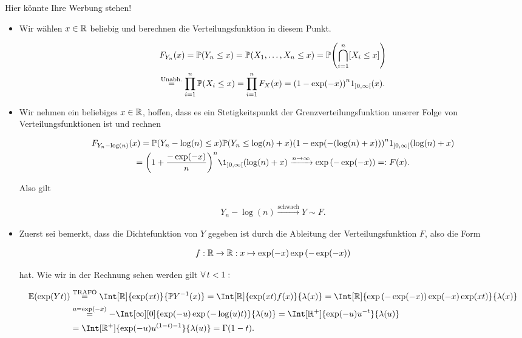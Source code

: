 \begin{solution}
  Hier könnte Ihre Werbung stehen!

  \begin{itemize}
    \item[(a)] Wir wählen $x \in \mathbb{R}$ beliebig und berechnen die Verteilungsfunktion in diesem Punkt.

    \begin{multline*}
      F_{Y_n}(x)
      = \mathbb{P} {\left ( Y_n \leq x \right )}
      = \mathbb{P} {\left ( X_1, \ldots, X_n \leq x \right )}
      = \mathbb{P} {\left ( \bigcap_{i=1}^n [X_i \leq x] \right )} \\
      \stackrel{\text{Unabh.}}{=}
        \prod_{i=1}^n \mathbb{P} {\left ( X_i \leq x \right )}
      = \prod_{i=1}^n F_X(x)
      = {\left ( 1 - \exp(-x) \right )}^n 1_{]0, \infty[}(x).
    \end{multline*}

    \item[(b)] Wir nehmen ein beliebiges $x \in \mathbb{R}$, hoffen, dass es ein Stetigkeitspunkt der Grenzverteilungsfunktion unserer Folge von Verteilungsfunktionen ist und rechnen

    \begin{multline*}
      F_{Y_n - \log(n)}(x)
      = \P \pbraces{Y_n - \log(n) \leq x}
        \P \pbraces{Y_n \leq \log(n) + x}
        \pbraces{1 - \exp(-\pbraces{\log(n) + x})}^n
      1_{]0,\infty[}(\log(n) + x) \\
      = \pbraces{1 + \frac{-\exp(-x)}{n}}^n
        \1_{]0, \infty[}(\log(n) + x)
      \xrightarrow{n \to \infty}
        \exp \pbraces{-\exp(-x)} =: F(x).
    \end{multline*}

    Also gilt

    \begin{align*}
      Y_n - \log(n) \xrightarrow{\text{schwach}} Y \sim F.
    \end{align*}

    \item[(c)] Zuerst sei bemerkt, dass die Dichtefunktion von $Y$ gegeben ist durch die Ableitung der Verteilungsfunktion $F$, also die Form

    \begin{align*}
      f:\mathbb{R} \to \mathbb{R}: x \mapsto \exp(-x) \exp {\left ( -\exp(-x) \right )}
    \end{align*}

    hat. Wie wir in der Rechnung sehen werden gilt $\forall \, t < 1:$

    \begin{align*}
      \E(\exp(Yt))
      & \stackrel{\text{TRAFO}}{=}
        \Int[\R]{\exp(xt)}{\P Y^{-1}(x)}
      = \Int[\R]{\exp(xt) f(x)}{\lambda(x)}
      = \Int[\R]{\exp \pbraces{-\exp(-x)} \exp(-x) \exp(xt)}{\lambda(x)} \\
      & \stackrel{u = \exp(-x)}{=}
        - \Int[\infty][0]{\exp(-u) \exp \pbraces{-\log(u)t}}{\lambda(u)}
      = \Int[\R^+]{\exp(-u) u^{-t}}{\lambda(u)} \\
      & =
        \Int[\R^+]{\exp(-u) u^{(1 - t) - 1}}{\lambda(u)}
      = \Gamma(1 - t).
    \end{align*}
  \end{itemize}
\end{solution}
